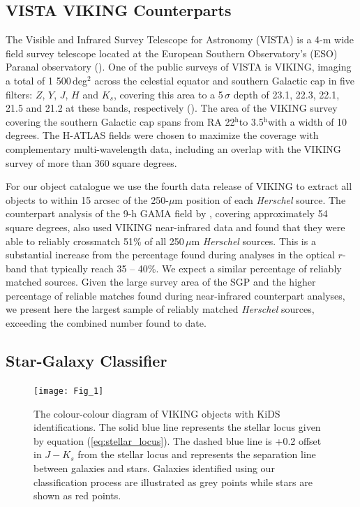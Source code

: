 \documentclass[fleqn,usenatbib]{mnras}
\newcommand{\hours}{\ensuremath{^\mathrm{h}}}
\begin{document}
\subsection{VISTA VIKING Counterparts}
\label{sec:vista_viking_counterparts}

The Visible and Infrared Survey Telescope for Astronomy (VISTA) is a 4-m wide field survey telescope located at the European Southern Observatory's (ESO) Paranal observatory (\citealt{Emerson_2010}). One of the public surveys of VISTA is VIKING, imaging a total of 1 500\,deg$^2$ across the celestial equator and southern Galactic cap in five filters: $Z$, $Y$, $J$, $H$ and $K_s$, covering this area to a 5\,$\sigma$ depth of 23.1, 22.3, 22.1, 21.5 and 21.2 at these bands, respectively (\citealt{Edge_2013}). The area of the VIKING survey covering the southern Galactic cap spans from RA 22\hours to 3.5\hours with a width of 10 degrees. The H-ATLAS fields were chosen to maximize the coverage with complementary multi-wavelength data, including an overlap with the VIKING survey of more than 360 square degrees. 

For our object catalogue we use the fourth data release of VIKING to extract all objects to within 15 arcsec of the 250-$\mu$m position of each \textit{Herschel} source. The counterpart analysis of the 9-h GAMA field by \citealt{Fleuren_2012}, covering approximately 54 square degrees, also used VIKING near-infrared data and found that they were able to reliably crossmatch 51\% of all 250\,$\mu$m \textit{Herschel} sources. This is a substantial increase from the percentage found during analyses in the optical $r$-band that typically reach 35 -- 40\%. We expect a similar percentage of reliably matched sources. Given the large survey area of the SGP and the higher percentage of reliable matches found during near-infrared counterpart analyses, we present here the largest sample of reliably matched \textit{Herschel} sources, exceeding the combined number found to date.

\subsection{Star-Galaxy Classifier}
\label{sec:star_galaxy_classifier}

\begin{figure}
	\texttt{[image: Fig\_1]}
	\caption{The colour-colour diagram of VIKING objects with KiDS identifications. The solid blue line represents the stellar locus given by equation (\ref{eq:stellar_locus}). The dashed blue line is +0.2 offset in $J - K_s$ from the stellar locus and represents the separation line between galaxies and stars. Galaxies identified using our classification process are illustrated as grey points while stars are shown as red points.}
	\label{fig:star_galaxy_classifer}
\end{figure}
\end{document}

